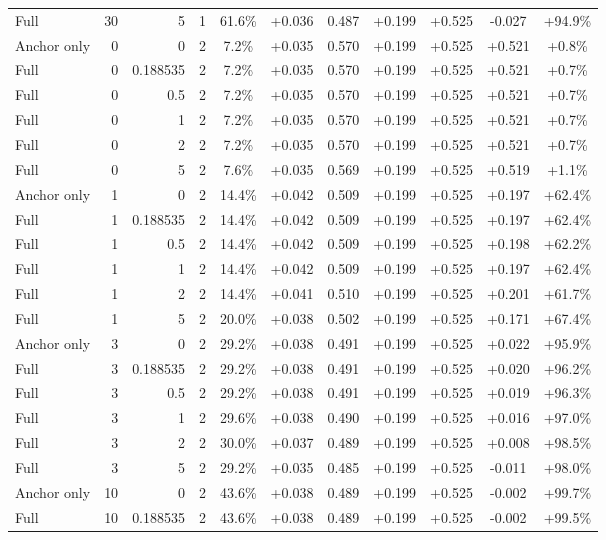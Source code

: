 \begin{table}[htbp]
\begin{tabular}{lrrrccccccc}
Full & 30 & 5 & 1 & 61.6\% & +0.036 & 0.487 & +0.199 & +0.525 & -0.027 & +94.9\% \\
Anchor only & 0 & 0 & 2 & 7.2\% & +0.035 & 0.570 & +0.199 & +0.525 & +0.521 & +0.8\% \\
Full & 0 & 0.188535 & 2 & 7.2\% & +0.035 & 0.570 & +0.199 & +0.525 & +0.521 & +0.7\% \\
Full & 0 & 0.5 & 2 & 7.2\% & +0.035 & 0.570 & +0.199 & +0.525 & +0.521 & +0.7\% \\
Full & 0 & 1 & 2 & 7.2\% & +0.035 & 0.570 & +0.199 & +0.525 & +0.521 & +0.7\% \\
Full & 0 & 2 & 2 & 7.2\% & +0.035 & 0.570 & +0.199 & +0.525 & +0.521 & +0.7\% \\
Full & 0 & 5 & 2 & 7.6\% & +0.035 & 0.569 & +0.199 & +0.525 & +0.519 & +1.1\% \\
Anchor only & 1 & 0 & 2 & 14.4\% & +0.042 & 0.509 & +0.199 & +0.525 & +0.197 & +62.4\% \\
Full & 1 & 0.188535 & 2 & 14.4\% & +0.042 & 0.509 & +0.199 & +0.525 & +0.197 & +62.4\% \\
Full & 1 & 0.5 & 2 & 14.4\% & +0.042 & 0.509 & +0.199 & +0.525 & +0.198 & +62.2\% \\
Full & 1 & 1 & 2 & 14.4\% & +0.042 & 0.509 & +0.199 & +0.525 & +0.197 & +62.4\% \\
Full & 1 & 2 & 2 & 14.4\% & +0.041 & 0.510 & +0.199 & +0.525 & +0.201 & +61.7\% \\
Full & 1 & 5 & 2 & 20.0\% & +0.038 & 0.502 & +0.199 & +0.525 & +0.171 & +67.4\% \\
Anchor only & 3 & 0 & 2 & 29.2\% & +0.038 & 0.491 & +0.199 & +0.525 & +0.022 & +95.9\% \\
Full & 3 & 0.188535 & 2 & 29.2\% & +0.038 & 0.491 & +0.199 & +0.525 & +0.020 & +96.2\% \\
Full & 3 & 0.5 & 2 & 29.2\% & +0.038 & 0.491 & +0.199 & +0.525 & +0.019 & +96.3\% \\
Full & 3 & 1 & 2 & 29.6\% & +0.038 & 0.490 & +0.199 & +0.525 & +0.016 & +97.0\% \\
Full & 3 & 2 & 2 & 30.0\% & +0.037 & 0.489 & +0.199 & +0.525 & +0.008 & +98.5\% \\
Full & 3 & 5 & 2 & 29.2\% & +0.035 & 0.485 & +0.199 & +0.525 & -0.011 & +98.0\% \\
Anchor only & 10 & 0 & 2 & 43.6\% & +0.038 & 0.489 & +0.199 & +0.525 & -0.002 & +99.7\% \\
Full & 10 & 0.188535 & 2 & 43.6\% & +0.038 & 0.489 & +0.199 & +0.525 & -0.002 & +99.5\% \\

\end{tabular}
\end{table}
